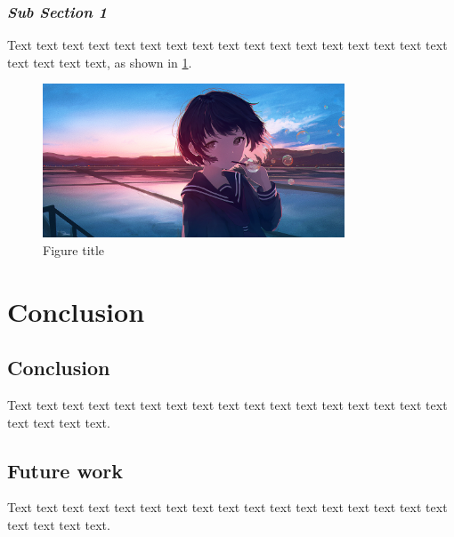\documentclass[12pt,a4paper]{article}
\numberwithin{equation}{section}
\begin{document}
{{\subsubsection{\textit{Sub Section 1}}
\hspace{2em}Text text text text text text text text text text text text text text text text text text text text text, as shown in \cref{fig:5- 1}.
\begin{figure}[h]
    \centering
    \includegraphics[width=0.8\textwidth, height=0.8\textwidth]{Fig example.png}
    \caption{Figure title}
    \label{fig:5- 1}
\end{figure}

\section{Conclusion}
\subsection{Conclusion}
\hspace{2em}Text text text text text text text text text text text text text text text text text text text text text.
\subsection{Future work}
\hspace{2em}Text text text text text text text text text text text text text text text text text text text text text.

\clearpage
{}
\printbibliography

}}
\end{document}
